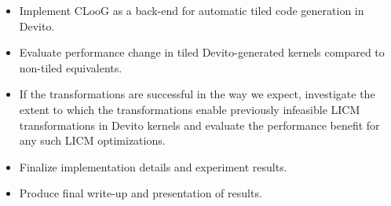 \documentclass[a4paper,12pt,twoside]{report}
\begin{document}
\begin{itemize}
    \item Implement CLooG as a back-end for automatic tiled code generation in Devito.
    \item Evaluate performance change in tiled Devito-generated kernels compared to non-tiled equivalents.
    \item If the transformations are successful in the way we expect, investigate the extent to which the transformations enable previously infeasible LICM transformations
        in Devito kernels and evaluate the performance benefit for any such LICM optimizations.
    \item Finalize implementation details and experiment results.
    \item Produce final write-up and presentation of results.
\end{itemize}
\end{document}
